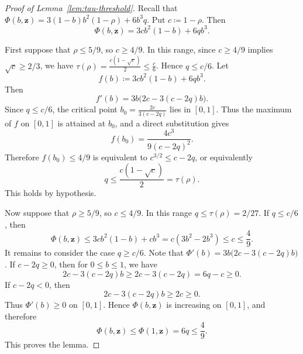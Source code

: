 \documentclass[10pt]{article}
\numberwithin{equation}{section}
\theoremstyle{definition}
\theoremstyle{remark}
\begin{document}
\begin{proof}[Proof of Lemma~\ref{lem:tau-threshold}]
Recall that $\Phi(b,\mathbf{z})=3(1-b)b^2(1-\rho)+6b^3q$. Put $c \coloneqq 1-\rho$. Then
\[
        \Phi(b,\mathbf{z})=3cb^2(1-b)+6qb^3.
\]

First suppose that $\rho\le5/9$, so $c\ge4/9$. In this range, since $c\ge4/9$ implies $\sqrt c\ge2/3$, we have $\tau(\rho)=\frac{c(1-\sqrt c)}2\le\frac c6$. Hence $q\le c/6$. Let
\[
        f(b) \coloneqq 3cb^2(1-b)+6qb^3.
\]
Then
\[
        f'(b)=3b\bigl(2c-3(c-2q)b\bigr).
\]
Since $q\le c/6$, the critical point $b_0=\frac{2c}{3(c-2q)}$ lies in $[0,1]$. Thus the maximum of $f$ on $[0,1]$ is attained at $b_0$, and a direct substitution gives
\[
        f(b_0)=\frac{4c^3}{9(c-2q)^2}.
\]
Therefore $f(b_0)\le4/9$ is equivalent to $c^{3/2}\le c-2q$,  or equivalently
\[
        q\le\frac{c(1-\sqrt c)}2=\tau(\rho).
\]
This holds by hypothesis.

Now suppose that $\rho\ge5/9$, so $c\le4/9$. In this range $q\le\tau(\rho)=2/27$. If $q\le c/6$, then
\[
        \Phi(b,\mathbf{z})
        \le 3cb^2(1-b)+cb^3
        =c(3b^2-2b^3)
        \le c
        \le\frac49.
\]
It remains to consider the case $q\ge c/6$. Note that $\Phi'(b)=3b\bigl(2c-3(c-2q)b\bigr)$. If $c-2q\ge0$, then for $0\le b\le1$, we have
\[
        2c-3(c-2q)b\ge 2c-3(c-2q)=6q-c\ge0.
\]
If $c-2q<0$, then
\[
        2c-3(c-2q)b\ge 2c\ge0.
\]
Thus $\Phi'(b)\ge0$ on $[0,1]$. Hence $\Phi(b,\mathbf{z})$ is increasing on $[0,1]$, and therefore
\[
        \Phi(b,\mathbf{z})\le\Phi(1,\mathbf{z})=6q\le\frac49.
\]
This proves the lemma.
\end{proof}
\end{document}
